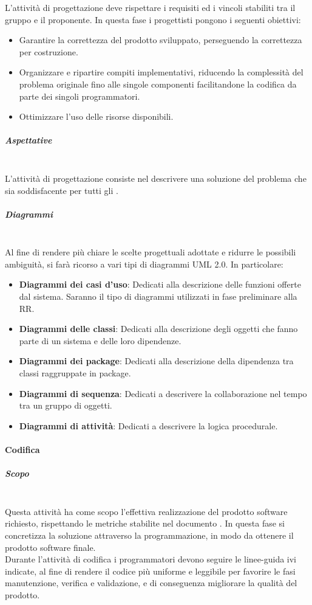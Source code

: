     L’attività di progettazione deve rispettare i requisiti ed i vincoli stabiliti tra il gruppo e il proponente. In questa fase i progettisti pongono i seguenti obiettivi: 
        \begin{itemize}
            \item Garantire la correttezza del prodotto sviluppato, perseguendo la correttezza per costruzione.
            \item Organizzare e ripartire compiti implementativi, riducendo la complessità del problema originale fino alle singole componenti facilitandone la codifica da parte dei singoli programmatori.
            \item Ottimizzare l'uso delle risorse disponibili. 
        \end{itemize}
    
    \subparagraph{Aspettative}
    ~\\
    L’attività di progettazione consiste nel descrivere una soluzione del problema che
    sia soddisfacente per tutti gli .
    

    

    \subparagraph{Diagrammi}
    ~\\
    Al fine di rendere più chiare le scelte progettuali adottate e ridurre le possibili ambiguità, si farà ricorso a vari tipi di diagrammi UML 2.0. In particolare:
        \begin{itemize}
            \item \textbf{Diagrammi dei casi d'uso}: Dedicati alla descrizione delle funzioni offerte dal sistema. Saranno il tipo di diagrammi utilizzati in fase preliminare alla RR.
            \item \textbf{Diagrammi delle classi}: Dedicati alla descrizione degli oggetti che fanno parte di un sistema e delle loro dipendenze.
            \item \textbf{Diagrammi dei package}: Dedicati  alla  descrizione  della  dipendenza  tra classi raggruppate in package.
            \item \textbf{Diagrammi di sequenza}: Dedicati a descrivere la collaborazione nel tempo tra un gruppo di oggetti.
            \item \textbf{Diagrammi di attività}: Dedicati a descrivere la logica procedurale.
        \end{itemize}
    

\paragraph{Codifica}
    \subparagraph{Scopo}
    ~\\
    Questa attività ha come scopo l’effettiva realizzazione del prodotto software richiesto, rispettando le metriche stabilite nel documento \PdQ. In questa fase si concretizza la soluzione attraverso la programmazione, in modo da ottenere il prodotto software finale. \\
    Durante l’attività di codifica i programmatori devono seguire le linee-guida ivi indicate, al fine di rendere il codice più uniforme e leggibile per favorire le fasi manutenzione, verifica e validazione, e di conseguenza migliorare la qualità del prodotto.
    
